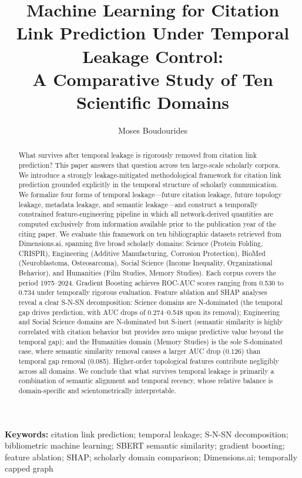 \documentclass[11pt,a4paper]{article}
\title{Machine Learning for Citation Link Prediction Under Temporal Leakage Control:\\A Comparative Study of Ten Scientific Domains}
\author{Moses Boudourides}
\affil{School of Professional Studies, Northwestern University, Evanston, IL, USA%
\authorcr\texttt{Moses.Boudourides@northwestern.edu}}
\date{}
\begin{document}
\sloppy

\maketitle

\begin{abstract}
What survives after temporal leakage is rigorously removed from citation link prediction? This paper answers that question across ten large-scale scholarly corpora. We introduce a strongly leakage-mitigated methodological framework for citation link prediction grounded explicitly in the temporal structure of scholarly communication. We formalize four forms of temporal leakage---future citation leakage, future topology leakage, metadata leakage, and semantic leakage---and construct a temporally constrained feature-engineering pipeline in which all network-derived quantities are computed exclusively from information available prior to the publication year of the citing paper. We evaluate this framework on ten bibliographic datasets retrieved from Dimensions.ai, spanning five broad scholarly domains: Science (Protein Folding, CRISPR), Engineering (Additive Manufacturing, Corrosion Protection), BioMed (Neuroblastoma, Osteosarcoma), Social Science (Income Inequality, Organizational Behavior), and Humanities (Film Studies, Memory Studies). Each corpus covers the period 1975--2024. Gradient Boosting achieves ROC-AUC scores ranging from 0.530 to 0.734 under temporally rigorous evaluation. Feature ablation and SHAP analyses reveal a clear S-N-SN decomposition: Science domains are N-dominated (the temporal gap drives prediction, with AUC drops of 0.274--0.548 upon its removal); Engineering and Social Science domains are N-dominated but S-inert (semantic similarity is highly correlated with citation behavior but provides zero unique predictive value beyond the temporal gap); and the Humanities domain (Memory Studies) is the sole S-dominated case, where semantic similarity removal causes a larger AUC drop (0.126) than temporal gap removal (0.085). Higher-order topological features contribute negligibly across all domains. We conclude that what survives temporal leakage is primarily a combination of semantic alignment and temporal recency, whose relative balance is domain-specific and scientometrically interpretable.
\end{abstract}

\noindent\textbf{Keywords:} citation link prediction; temporal leakage; S-N-SN decomposition; bibliometric machine learning; SBERT semantic similarity; gradient boosting; feature ablation; SHAP; scholarly domain comparison; Dimensions.ai; temporally capped graph
\end{document}

